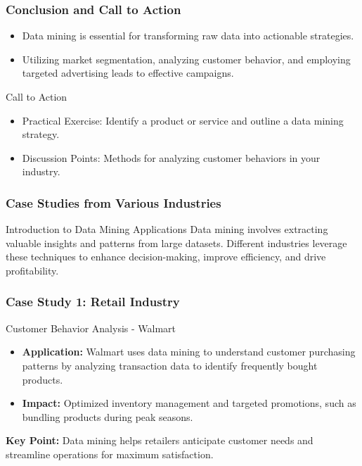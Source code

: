 \documentclass[aspectratio=169]{beamer}
\begin{document}
\begin{frame}[fragile]
    \frametitle{Conclusion and Call to Action}
    \begin{itemize}
        \item Data mining is essential for transforming raw data into actionable strategies.
        \item Utilizing market segmentation, analyzing customer behavior, and employing targeted advertising leads to effective campaigns.
    \end{itemize}

    \begin{block}{Call to Action}
        \begin{itemize}
            \item Practical Exercise: Identify a product or service and outline a data mining strategy.
            \item Discussion Points: Methods for analyzing customer behaviors in your industry.
        \end{itemize}
    \end{block}
\end{frame}

\begin{frame}[fragile]
    \frametitle{Case Studies from Various Industries}
    \begin{block}{Introduction to Data Mining Applications}
        Data mining involves extracting valuable insights and patterns from large datasets. Different industries leverage these techniques to enhance decision-making, improve efficiency, and drive profitability. 
    \end{block}
\end{frame}

\begin{frame}[fragile]
    \frametitle{Case Study 1: Retail Industry}
    \begin{block}{Customer Behavior Analysis - Walmart}
        \begin{itemize}
            \item \textbf{Application:} Walmart uses data mining to understand customer purchasing patterns by analyzing transaction data to identify frequently bought products.
            \item \textbf{Impact:} Optimized inventory management and targeted promotions, such as bundling products during peak seasons.
        \end{itemize}
        \textbf{Key Point:} Data mining helps retailers anticipate customer needs and streamline operations for maximum satisfaction.
    \end{block}
\end{frame}
\end{document}
